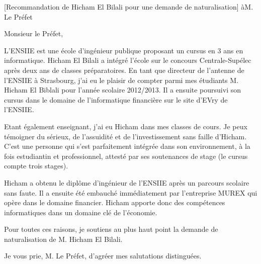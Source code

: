 \documentclass[a4paper,10pt]{article}
\begin{document}

\begin{letter}[Recommandation de Hicham El Bilali pour une demande de naturalisation]
	  {à}{M. Le Préfet}


Monsieur le Préfet,

L'ENSIIE est une école d'ingénieur publique proposant un cursus en 3 ans en informatique.
Hicham El Bilali a intégré l'école sur le concours Centrale-Supélec après deux ans de classes préparatoires.
En tant que directeur de l'antenne de l'ENSIIE à Strasbourg, j'ai eu le plaisir de compter 
parmi mes étudiants M. Hicham El Biblali pour l'année scolaire 2012/2013. Il a ensuite
poursuivi son cursus dans le domaine de l'informatique financière sur le site d'EVry de 
l'ENSIIE.

Etant également enseignant, j'ai eu Hicham dans mes classes de cours. Je peux témoigner du
sérieux, de l'assuidité et de l'investissement sans faille d'Hicham. C'est une personne
qui s'est parfaitement intégrée dans son environnement, à la fois estudiantin et professionnel,
attesté par ses soutenances de stage (le cursus compte trois stages).

Hicham a obtenu le diplôme d'ingénieur de l'ENSIIE après un parcours scolaire sans faute.
Il a ensuite été embauché immédiatement par l'entreprise MUREX qui opère dans le domaine financier.
Hicham apporte donc des compétences informatiques dans un domaine clé de l'économie.

Pour toutes ces raisons, je soutiens au plus haut point la demande de naturalisation de M. Hicham El Bilali.

Je vous prie, M. Le Préfet, d'agréer mes salutations distinguées.

\end{letter}
\begin{flushright}
\end{flushright}
\end{document}
